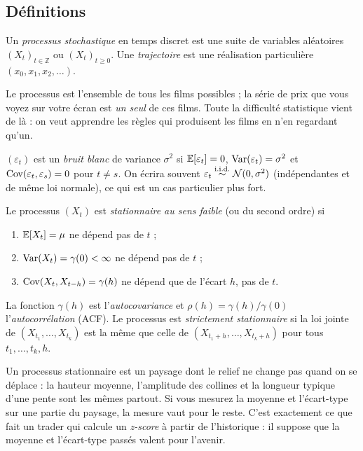 \documentclass[11pt,a4paper]{article}
\begin{document}
\subsection{Définitions}

\begin{definition}
Un \emph{processus stochastique} en temps discret est une suite de variables aléatoires $(X_t)_{t\in\mathbb{Z}}$ ou $(X_t)_{t\ge0}$. Une \emph{trajectoire} est une réalisation particulière $(x_0, x_1, x_2, \dots)$.
\end{definition}

\begin{intuition}
Le processus est l'ensemble de tous les films possibles ; la série de prix que vous voyez sur votre écran est \emph{un seul} de ces films. Toute la difficulté statistique vient de là : on veut apprendre les règles qui produisent les films en n'en regardant qu'un.
\end{intuition}

\begin{definition}
$(\varepsilon_t)$ est un \emph{bruit blanc} de variance $\sigma^2$ si $\mathbb{E}[\varepsilon_t]=0$, $\operatorname{Var}(\varepsilon_t) = \sigma^2$ et $\operatorname{Cov}(\varepsilon_t,\varepsilon_s) = 0$ pour $t \ne s$. On écrira souvent $\varepsilon_t \overset{\text{i.i.d.}}{\sim} \mathcal{N}(0,\sigma^2)$ (indépendantes et de même loi normale), ce qui est un cas particulier plus fort.
\end{definition}

\begin{definition}[Stationnarité]
Le processus $(X_t)$ est \emph{stationnaire au sens faible} (ou \og du second ordre\fg) si
\begin{enumerate}[label=(\roman*)]
\item $\mathbb{E}[X_t] = \mu$ ne dépend pas de $t$ ;
\item $\operatorname{Var}(X_t) = \gamma(0) < \infty$ ne dépend pas de $t$ ;
\item $\operatorname{Cov}(X_t, X_{t-h}) = \gamma(h)$ ne dépend que de l'écart $h$, pas de $t$.
\end{enumerate}
La fonction $\gamma(h)$ est l'\emph{autocovariance} et $\rho(h) = \gamma(h)/\gamma(0)$ l'\emph{autocorrélation} (ACF). Le processus est \emph{strictement stationnaire} si la loi jointe de $(X_{t_1},\dots,X_{t_k})$ est la même que celle de $(X_{t_1+h},\dots,X_{t_k+h})$ pour tous $t_1,\dots,t_k,h$.
\end{definition}

\begin{intuition}
Un processus stationnaire est un paysage dont le relief ne change pas quand on se déplace : la hauteur moyenne, l'amplitude des collines et la longueur typique d'une pente sont les mêmes partout. Si vous mesurez la moyenne et l'écart-type sur une partie du paysage, la mesure vaut pour le reste. C'est exactement ce que fait un trader qui calcule un \emph{z-score} à partir de l'historique : il suppose que la moyenne et l'écart-type passés valent pour l'avenir.
\end{intuition}
\end{document}

